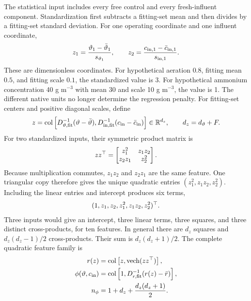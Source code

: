 The statistical input includes every free control and every fresh-influent component. Standardization first subtracts a fitting-set mean and then divides by a fitting-set standard deviation. For one operating coordinate and one influent coordinate,
\begin{equation}
\equationname{Illustrative standardization of a control and an influent concentration}
z_1=\frac{\vartheta_1-\bar\vartheta_1}{s_{\vartheta_1}},\qquad
z_2=\frac{c_{{\rm in},1}-\bar c_{{\rm in},1}}{s_{{\rm in},1}}.
\end{equation}
These are dimensionless coordinates. For hypothetical aeration $0.8$, fitting mean $0.5$, and fitting scale $0.1$, the standardized value is 3. For hypothetical ammonium concentration 40 g m$^{-3}$ with mean 30 and scale 10 g m$^{-3}$, the value is 1. The different native units no longer determine the regression penalty. For fitting-set centers and positive diagonal scales, define
\begin{equation}
\equationname{Standardized plant input vector and its dimension}
z=\operatorname{col}\left[D_{\vartheta,\rm fit}^{-1}(\vartheta-\bar\vartheta),
D_{{\rm in},\rm fit}^{-1}(c_{\rm in}-\bar c_{\rm in})\right]
\in\mathbb R^{d_z},\qquad d_z=d_\vartheta+F.
\label{eq:plant_standardized_input}
\end{equation}
For two standardized inputs, their symmetric product matrix is
\begin{equation}
\equationname{Illustrative quadratic product matrix of two standardized inputs}
zz^\top=\begin{bmatrix}z_1^2&z_1z_2\\z_2z_1&z_2^2\end{bmatrix}.
\end{equation}
Because multiplication commutes, $z_1z_2$ and $z_2z_1$ are the same feature. One triangular copy therefore gives the unique quadratic entries $(z_1^2,z_1z_2,z_2^2)$. Including the linear entries and intercept produces six terms,
\begin{equation}
\equationname{Illustrative unique-monomial second-order feature vector}
(1,z_1,z_2,z_1^2,z_1z_2,z_2^2)^\top.
\end{equation}
Three inputs would give an intercept, three linear terms, three squares, and three distinct cross-products, for ten features. In general there are $d_z$ squares and $d_z(d_z-1)/2$ cross-products. Their sum is $d_z(d_z+1)/2$. The complete quadratic feature family is
\begin{align}
\equationname{Linear and unique-quadratic feature coordinates}
r(z)&=\operatorname{col}\left[z,\operatorname{vech}(zz^\top)\right],\\
\equationname{Centered and scaled plant regression feature vector}
\phi(\vartheta,c_{\rm in})&=\operatorname{col}\left[1,D_{r,\rm fit}^{-1}(r(z)-\bar r)\right],\\
\equationname{Dimension of the unique-monomial plant feature vector}
n_\phi&=1+d_z+\frac{d_z(d_z+1)}{2}.
\label{eq:plant_features}
\end{align}
